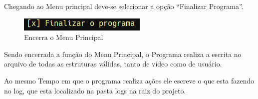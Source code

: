 \documentclass[12pt, a4paper]{article}
\begin{document}
Chegando ao Menu principal deve-se selecionar a opção ``Finalizar Programa''. 

\begin{figure}[!htb]
	\centering
	\includegraphics[keepaspectratio]{finalizar.png}
	\caption{\label{fig:finalizar.png} Encerra o Menu Principal}
\end{figure}

Sendo encerrada a função do Menu Principal, o Programa realiza a escrita no arquivo de todas as estruturas válidas, tanto de vídeo como de usuário.

Ao mesmo Tempo em que o programa realiza ações ele escreve o que esta fazendo no log, que esta localizado na pasta logs na raiz do projeto.
\end{document}

